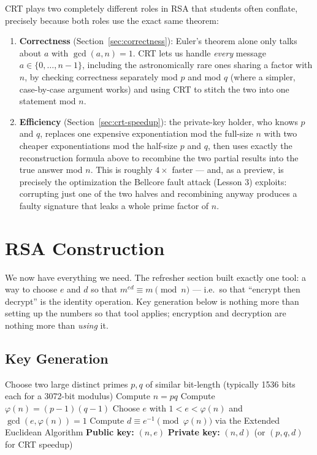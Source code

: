 \begin{remark}
CRT plays two completely different roles in RSA that students often conflate, precisely because both roles use the exact same theorem:
\begin{enumerate}
\item \textbf{Correctness} (Section~\ref{sec:correctness}): Euler's theorem alone only talks about $a$ with $\gcd(a,n)=1$. CRT lets us handle \emph{every} message $a\in\{0,\dots,n-1\}$, including the astronomically rare ones sharing a factor with $n$, by checking correctness separately mod $p$ and mod $q$ (where a simpler, case-by-case argument works) and using CRT to stitch the two into one statement mod $n$.
\item \textbf{Efficiency} (Section~\ref{sec:crt-speedup}): the private-key holder, who knows $p$ and $q$, replaces one expensive exponentiation mod the full-size $n$ with two cheaper exponentiations mod the half-size $p$ and $q$, then uses exactly the reconstruction formula above to recombine the two partial results into the true answer mod $n$. This is roughly $4\times$ faster — and, as a preview, is precisely the optimization the Bellcore fault attack (Lesson 3) exploits: corrupting just one of the two halves and recombining anyway produces a faulty signature that leaks a whole prime factor of $n$.
\end{enumerate}
\end{remark}

\section{RSA Construction}\label{sec:rsa-construction}

We now have everything we need. The refresher section built exactly one tool: a way to choose $e$ and $d$ so that $m^{ed}\equiv m\pmod n$ — i.e.\ so that ``encrypt then decrypt'' is the identity operation. Key generation below is nothing more than setting up the numbers so that tool applies; encryption and decryption are nothing more than \emph{using} it.

\subsection{Key Generation}

\begin{algorithm}[h]
\caption{RSA Key Generation}
\begin{algorithmic}[1]
\State Choose two large distinct primes $p, q$ of similar bit-length (typically 1536 bits each for a 3072-bit modulus)
\State Compute $n = pq$
\State Compute $\varphi(n) = (p-1)(q-1)$
\State Choose $e$ with $1 < e < \varphi(n)$ and $\gcd(e, \varphi(n)) = 1$
\State Compute $d \equiv e^{-1} \pmod{\varphi(n)}$ via the Extended Euclidean Algorithm
\State \textbf{Public key:} $(n, e)$ \qquad \textbf{Private key:} $(n, d)$ \quad (or $(p,q,d)$ for CRT speedup)
\end{algorithmic}
\end{algorithm}

